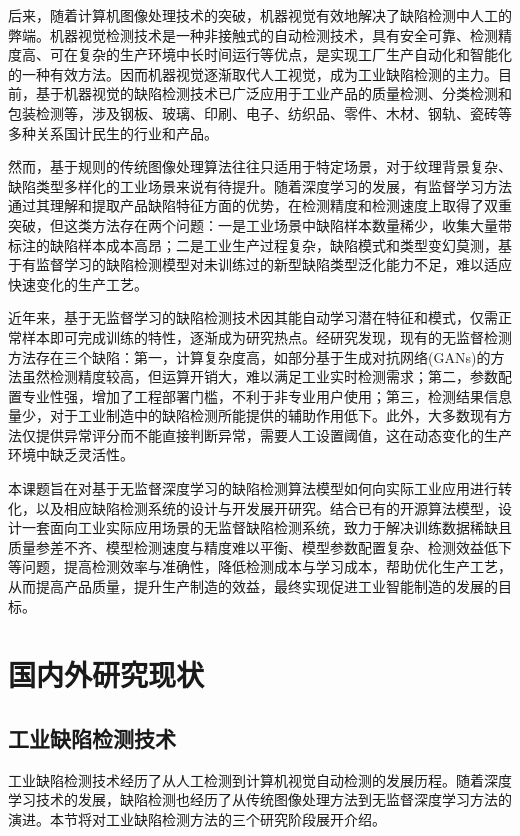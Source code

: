 \documentclass[
  ]{njuthesis}
\begin{document}
后来，随着计算机图像处理技术的突破，机器视觉有效地解决了缺陷检测中人工的弊端。机器视觉检测技术是一种非接触式的自动检测技术，具有安全可靠、检测精度高、可在复杂的生产环境中长时间运行等优点，是实现工厂生产自动化和智能化的一种有效方法\cite{[4]}。因而机器视觉逐渐取代人工视觉，成为工业缺陷检测的主力。目前，基于机器视觉的缺陷检测技术已广泛应用于工业产品的质量检测、分类检测和包装检测等，涉及钢板、玻璃、印刷、电子、纺织品、零件、木材、钢轨、瓷砖等多种关系国计民生的行业和产品\cite{[5]}。

然而，基于规则的传统图像处理算法往往只适用于特定场景，对于纹理背景复杂、缺陷类型多样化的工业场景来说有待提升。随着深度学习的发展，有监督学习方法通过其理解和提取产品缺陷特征方面的优势，在检测精度和检测速度上取得了双重突破，但这类方法存在两个问题：一是工业场景中缺陷样本数量稀少，收集大量带标注的缺陷样本成本高昂；二是工业生产过程复杂，缺陷模式和类型变幻莫测，基于有监督学习的缺陷检测模型对未训练过的新型缺陷类型泛化能力不足，难以适应快速变化的生产工艺。

近年来，基于无监督学习的缺陷检测技术因其能自动学习潜在特征和模式，仅需正常样本即可完成训练的特性，逐渐成为研究热点。经研究发现，现有的无监督检测方法存在三个缺陷：第一，计算复杂度高，如部分基于生成对抗网络(GANs)的方法虽然检测精度较高，但运算开销大，难以满足工业实时检测需求；第二，参数配置专业性强，增加了工程部署门槛，不利于非专业用户使用；第三，检测结果信息量少，对于工业制造中的缺陷检测所能提供的辅助作用低下。此外，大多数现有方法仅提供异常评分而不能直接判断异常，需要人工设置阈值，这在动态变化的生产环境中缺乏灵活性。

本课题旨在对基于无监督深度学习的缺陷检测算法模型如何向实际工业应用进行转化，以及相应缺陷检测系统的设计与开发展开研究。结合已有的开源算法模型，设计一套面向工业实际应用场景的无监督缺陷检测系统，致力于解决训练数据稀缺且质量参差不齐、模型检测速度与精度难以平衡、模型参数配置复杂、检测效益低下等问题，提高检测效率与准确性，降低检测成本与学习成本，帮助优化生产工艺，从而提高产品质量，提升生产制造的效益，最终实现促进工业智能制造的发展的目标。

\section{国内外研究现状}

\subsection{工业缺陷检测技术}

工业缺陷检测技术经历了从人工检测到计算机视觉自动检测的发展历程。随着深度学习技术的发展，缺陷检测也经历了从传统图像处理方法到无监督深度学习方法的演进。本节将对工业缺陷检测方法的三个研究阶段展开介绍。
\end{document}
